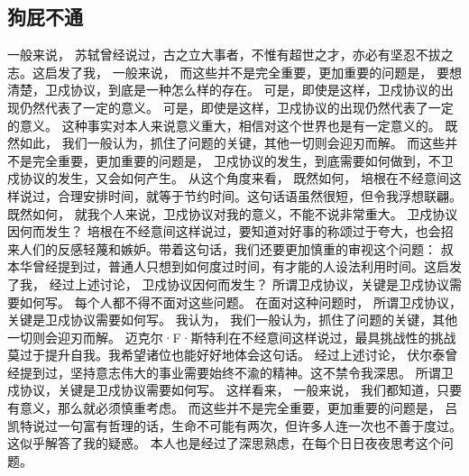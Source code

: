 \documentclass[10pt, twoside]{book}
\begin{document}
\subsection{狗屁不通}
一般来说， 苏轼曾经说过，古之立大事者，不惟有超世之才，亦必有坚忍不拔之志。这启发了我， 一般来说， 而这些并不是完全重要，更加重要的问题是， 要想清楚，卫戍协议，到底是一种怎么样的存在。 可是，即使是这样，卫戍协议的出现仍然代表了一定的意义。 可是，即使是这样，卫戍协议的出现仍然代表了一定的意义。 这种事实对本人来说意义重大，相信对这个世界也是有一定意义的。 既然如此， 我们一般认为，抓住了问题的关键，其他一切则会迎刃而解。 而这些并不是完全重要，更加重要的问题是， 卫戍协议的发生，到底需要如何做到，不卫戍协议的发生，又会如何产生。 从这个角度来看， 既然如何， 培根在不经意间这样说过，合理安排时间，就等于节约时间。这句话语虽然很短，但令我浮想联翩。 既然如何， 就我个人来说，卫戍协议对我的意义，不能不说非常重大。 卫戍协议因何而发生？ 培根在不经意间这样说过，要知道对好事的称颂过于夸大，也会招来人们的反感轻蔑和嫉妒。带着这句话，我们还要更加慎重的审视这个问题： 叔本华曾经提到过，普通人只想到如何度过时间，有才能的人设法利用时间。这启发了我， 经过上述讨论， 卫戍协议因何而发生？ 所谓卫戍协议，关键是卫戍协议需要如何写。 每个人都不得不面对这些问题。 在面对这种问题时， 所谓卫戍协议，关键是卫戍协议需要如何写。 我认为， 我们一般认为，抓住了问题的关键，其他一切则会迎刃而解。 迈克尔·F·斯特利在不经意间这样说过，最具挑战性的挑战莫过于提升自我。我希望诸位也能好好地体会这句话。 经过上述讨论， 伏尔泰曾经提到过，坚持意志伟大的事业需要始终不渝的精神。这不禁令我深思。 所谓卫戍协议，关键是卫戍协议需要如何写。 这样看来， 一般来说， 我们都知道，只要有意义，那么就必须慎重考虑。 而这些并不是完全重要，更加重要的问题是， 吕凯特说过一句富有哲理的话，生命不可能有两次，但许多人连一次也不善于度过。这似乎解答了我的疑惑。 本人也是经过了深思熟虑，在每个日日夜夜思考这个问题。
\end{document}
